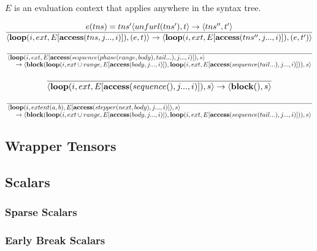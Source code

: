 $E$ is an evaluation context that applies anywhere in the syntax tree.

\[
\frac{e(tns) = tns' \langle unfurl(tns'), t\rangle \rightarrow \langle tns'', t'\rangle}
{\langle \text{\textbf{loop}}(i, ext, E[\text{\textbf{access}}(tns, j..., i)]), (e, t)\rangle \rightarrow \langle \text{\textbf{loop}}(i, ext, E[\text{\textbf{access}}(tns'', j..., i)]), (e, t')\rangle}
\]

\[
\frac{}
{\splitfrac{\langle \finchloop(i, ext, E[\finchaccess(sequence(phase(range, body), tail...), j..., i)]), s\rangle
    }{\rightarrow \langle \finchblock(\finchloop(i, ext \cup range, E[\finchaccess(body, j..., i)]), \finchloop(i, ext, E[\finchaccess(sequence(tail...), j..., i)])), s\rangle}}
\]

\[
\frac{}
{\langle \text{\textbf{loop}}(i, ext, E[\text{\textbf{access}}(sequence(), j..., i)]), s\rangle \rightarrow \langle \text{\textbf{block}}(), s\rangle}
\]

\[
\frac{}
{\splitfrac{\langle \finchloop(i, extent(a, b), E[\finchaccess(stepper(next, body), j..., i)]), s\rangle
    }{\rightarrow \langle \finchblock(\finchloop(i, ext \cup range, E[\finchaccess(body, j..., i)]), \finchloop(i, ext, E[\finchaccess(sequence(tail...), j..., i)])), s\rangle}}
\]



\subsection{Wrapper Tensors}

\subsection{Scalars}

\subsubsection{Sparse Scalars}
\subsubsection{Early Break Scalars}

